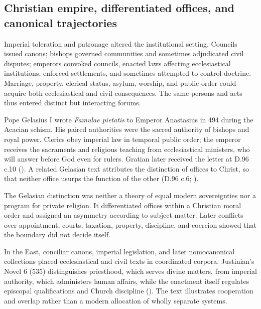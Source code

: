 \subsection{Christian empire, differentiated offices, and canonical trajectories}

Imperial toleration and patronage altered the institutional setting. Councils issued canons; bishops governed communities and sometimes adjudicated civil disputes; emperors convoked councils, enacted laws affecting ecclesiastical institutions, enforced settlements, and sometimes attempted to control doctrine. Marriage, property, clerical status, asylum, worship, and public order could acquire both ecclesiastical and civil consequences. The same persons and acts thus entered distinct but interacting forums.

Pope Gelasius I wrote \emph{Famulae pietatis} to Emperor Anastasius in 494 during the Acacian schism. His paired authorities were the sacred authority of bishops and royal power. Clerics obey imperial law in temporal public order; the emperor receives the sacraments and religious teaching from ecclesiastical ministers, who will answer before God even for rulers. Gratian later received the letter at D.96 c.10 (). A related Gelasian text attributes the distinction of offices to Christ, so that neither office usurps the function of the other (D.96 c.6; ).

The Gelasian distinction was neither a theory of equal modern sovereignties nor a program for private religion. It differentiated offices within a Christian moral order and assigned an asymmetry according to subject matter. Later conflicts over appointment, courts, taxation, property, discipline, and coercion showed that the boundary did not decide itself.

In the East, conciliar canons, imperial legislation, and later nomocanonical collections placed ecclesiastical and civil texts in coordinated corpora. Justinian's Novel 6 (535) distinguishes priesthood, which serves divine matters, from imperial authority, which administers human affairs, while the enactment itself regulates episcopal qualifications and Church discipline (). The text illustrates cooperation and overlap rather than a modern allocation of wholly separate systems.

